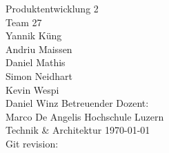     \begin{titlepage}
        \begin{center}
            \makeatletter
            {\Large Produktentwicklung 2} \\
            \vfill{}
            {\LARGE \@title}
            \vfill{}
            {Team 27 \\
            Yannik Küng \\
            Andriu Maissen \\
            Daniel Mathis \\
            Simon Neidhart \\
            Kevin Wespi \\
            Daniel Winz}
            \vfill{}
            {Betreuender Dozent: \\
            Marco De Angelis}
            \vfill{}
            {Hochschule Luzern \\
            Technik \& Architektur}
            \vfill
            {\today \\
            Git revision: 
            }
            \makeatother
        \end{center}
    \end{titlepage}

